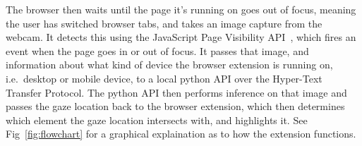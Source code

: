 \documentclass{report}
\begin{document}
The browser then waits until the page it's running on goes out of focus, meaning the user has switched browser tabs, and takes an image capture from the webcam. It detects this using the JavaScript Page Visibility API~\cite{pagevisibility}, which fires an event when the page goes in or out of focus. It passes that image, and information about what kind of device the browser extension is running on, i.e.\ desktop or mobile device, to a local python API over the Hyper-Text Transfer Protocol. The python API then performs inference on that image and passes the gaze location back to the browser extension, which then determines which element the gaze location intersects with, and highlights it. See Fig~\ref{fig:flowchart} for a graphical explaination as to how the extension functions. 

\begin{figure}
    \begin{center}

\end{center}
\end{figure}
\end{document}
